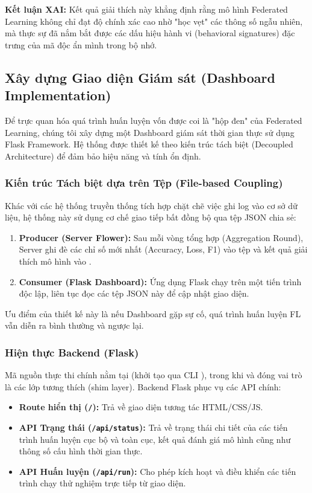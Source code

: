 \textbf{Kết luận XAI:} Kết quả giải thích này khẳng định rằng mô hình Federated Learning không chỉ đạt độ chính xác cao nhờ "học vẹt" các thông số ngẫu nhiên, mà thực sự đã nắm bắt được các dấu hiệu hành vi (behavioral signatures) đặc trưng của mã độc ẩn mình trong bộ nhớ.

\subsection{Xây dựng Giao diện Giám sát (Dashboard Implementation)}

Để trực quan hóa quá trình huấn luyện vốn được coi là "hộp đen" của Federated Learning, chúng tôi xây dựng một Dashboard giám sát thời gian thực sử dụng Flask Framework. Hệ thống được thiết kế theo kiến trúc tách biệt (Decoupled Architecture) để đảm bảo hiệu năng và tính ổn định.

\subsubsection{Kiến trúc Tách biệt dựa trên Tệp (File-based Coupling)}
Khác với các hệ thống truyền thống tích hợp chặt chẽ việc ghi log vào cơ sở dữ liệu, hệ thống này sử dụng cơ chế giao tiếp bất đồng bộ qua tệp JSON chia sẻ:

\begin{enumerate}
    \item \textbf{Producer (Server Flower):} Sau mỗi vòng tổng hợp (Aggregation Round), Server ghi đè các chỉ số mới nhất (Accuracy, Loss, F1) vào tệp  và kết quả giải thích mô hình vào .
    \item \textbf{Consumer (Flask Dashboard):} Ứng dụng Flask chạy trên một tiến trình độc lập, liên tục đọc các tệp JSON này để cập nhật giao diện.
\end{enumerate}

Ưu điểm của thiết kế này là nếu Dashboard gặp sự cố, quá trình huấn luyện FL vẫn diễn ra bình thường và ngược lại.

\subsubsection{Hiện thực Backend (Flask)}
Mã nguồn thực thi chính nằm tại  (khởi tạo qua CLI ), trong khi  và  đóng vai trò là các lớp tương thích (shim layer). Backend Flask phục vụ các API chính:
\begin{itemize}
    \item \textbf{Route hiển thị (\texttt{/}):} Trả về giao diện tương tác HTML/CSS/JS.
    \item \textbf{API Trạng thái (\texttt{/api/status}):} Trả về trạng thái chi tiết của các tiến trình huấn luyện cục bộ và toàn cục, kết quả đánh giá mô hình cũng như thông số cấu hình thời gian thực.
    \item \textbf{API Huấn luyện (\texttt{/api/run}):} Cho phép kích hoạt và điều khiển các tiến trình chạy thử nghiệm trực tiếp từ giao diện.
\end{itemize}

